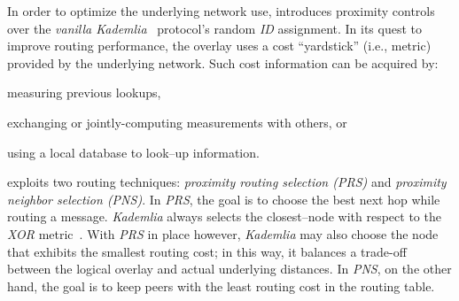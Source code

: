 
In order to optimize the underlying network use,
\cite{KLKP2008} introduces proximity
controls over the \emph{vanilla Kademlia}~\cite{maymounkov_kademlia_2002} 
protocol's random \emph{ID} assignment.
In its quest to improve routing performance, the overlay uses 
a cost ``yardstick'' (i.e., metric) provided by the underlying network.
Such cost information can be acquired by:
\begin{inparaenum}
  \item measuring previous lookups,
  \item exchanging or jointly-computing measurements with others, or 
  \item using a local database to look--up information.
\end{inparaenum}

\cite{KLKP2008} exploits two routing techniques: 
\emph{proximity routing selection (PRS)} and 
\emph{proximity neighbor selection (PNS)}.
In \emph{PRS}, the goal is to choose the best next hop while routing a message.
\emph{Kademlia} always selects the closest--node 
with respect to the \emph{XOR} metric~\cite{maymounkov_kademlia_2002}.
With \emph{PRS} in place however, \emph{Kademlia} may also choose 
the node that exhibits the smallest routing cost; in this way, 
it balances a trade-off between the logical overlay and 
actual underlying distances.
In \emph{PNS}, on the other hand, the goal is to keep peers 
with the least routing cost in the routing table. 

